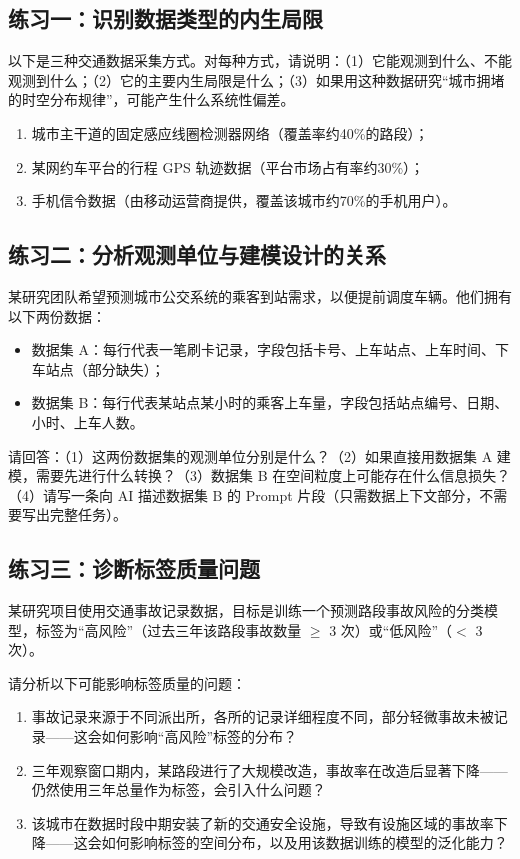 \subsection*{练习一：识别数据类型的内生局限}

以下是三种交通数据采集方式。对每种方式，请说明：（1）它能观测到什么、不能观测到什么；（2）它的主要内生局限是什么；（3）如果用这种数据研究“城市拥堵的时空分布规律”，可能产生什么系统性偏差。

\begin{enumerate}
  \item 城市主干道的固定感应线圈检测器网络（覆盖率约40\%的路段）；
  \item 某网约车平台的行程 GPS 轨迹数据（平台市场占有率约30\%）；
  \item 手机信令数据（由移动运营商提供，覆盖该城市约70\%的手机用户）。
\end{enumerate}

\subsection*{练习二：分析观测单位与建模设计的关系}

某研究团队希望预测城市公交系统的乘客到站需求，以便提前调度车辆。他们拥有以下两份数据：

\begin{itemize}
  \item 数据集 A：每行代表一笔刷卡记录，字段包括卡号、上车站点、上车时间、下车站点（部分缺失）；
  \item 数据集 B：每行代表某站点某小时的乘客上车量，字段包括站点编号、日期、小时、上车人数。
\end{itemize}

请回答：（1）这两份数据集的观测单位分别是什么？（2）如果直接用数据集 A 建模，需要先进行什么转换？（3）数据集 B 在空间粒度上可能存在什么信息损失？（4）请写一条向 AI 描述数据集 B 的 Prompt 片段（只需数据上下文部分，不需要写出完整任务）。

\subsection*{练习三：诊断标签质量问题}

某研究项目使用交通事故记录数据，目标是训练一个预测路段事故风险的分类模型，标签为“高风险”（过去三年该路段事故数量 $\geq$ 3 次）或“低风险”（$<$ 3 次）。

请分析以下可能影响标签质量的问题：

\begin{enumerate}
  \item 事故记录来源于不同派出所，各所的记录详细程度不同，部分轻微事故未被记录——这会如何影响“高风险”标签的分布？
  \item 三年观察窗口期内，某路段进行了大规模改造，事故率在改造后显著下降——仍然使用三年总量作为标签，会引入什么问题？
  \item 该城市在数据时段中期安装了新的交通安全设施，导致有设施区域的事故率下降——这会如何影响标签的空间分布，以及用该数据训练的模型的泛化能力？
\end{enumerate}

